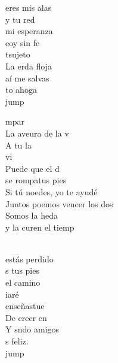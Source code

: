\begin{cancion}%
	 eres mis alas\\
	 y tu red\\
	 mi esperanza\\
	 eoy sin fe\\
	tsujeto \\
	La erda floja\\
	 aí me salvas\\
	to ahoga\\jump\\
	\begin{chorus}%
	mpar\\
	La aveura de la v\\
	A tu la\\
	vi \\
	Puede que el d\\
	se rompatus pies \\
	Si tú noedes, yo te ayudé \\
	Juntos poemos vencer los dos\\
	Somos la heda \\
	y la curen el tiemp \\
	\end{chorus}%
	\jump\\
	estás perdido\\
	 s tus pies\\
	 el camino\\
	 iaré\\
	  enseñastue\\
	De creer en \\
	Y sndo amigos\\
	s feliz.\\jump\\

\end{cancion}
